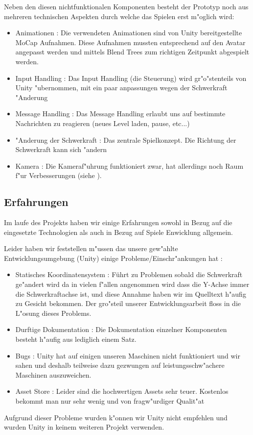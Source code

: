 Neben den diesen nichtfunktionalen Komponenten besteht der Prototyp noch aus mehreren technischen Aspekten durch welche das Spielen erst m"oglich wird:
\begin{itemize}
	\item Animationen : Die verwendeten Animationen sind von Unity bereitgestellte MoCap Aufnahmen. Diese Aufnahmen mussten entsprechend auf den Avatar angepasst werden und mittels Blend Trees zum richtigen Zeitpunkt abgespielt werden.
	\item Input Handling : Das Input Handling (die Steuerung) wird gr"o"stenteils von Unity "ubernommen, mit ein paar anpassungen wegen der Schwerkraft "Anderung
	\item Message Handling : Das Message Handling erlaubt uns auf bestimmte Nachrichten zu reagieren (neues Level laden, pause, etc...)
	\item "Anderung der Schwerkraft : Das zentrale Spielkonzept. Die Richtung der Schwerkraft kann sich "andern
	\item Kamera : Die Kameraf"uhrung funktioniert zwar, hat allerdings noch Raum f"ur Verbesserungen (siehe ).
\end{itemize} 
%
\subsection{Erfahrungen}
\label{sec:results/xp}
%
Im laufe des Projekts haben wir einige Erfahrungen sowohl in Bezug auf die eingesetzte Technologien als auch in Bezug auf Spiele Enwicklung allgemein.

Leider haben wir feststellen m"ussen das unsere gew"ahlte Entwicklungsumgebung (Unity) einige Probleme/Einschr"ankungen hat :
\begin{itemize}
	\item Statisches Koordinatensystem : Führt zu Problemen sobald die Schwerkraft ge"andert wird da in vielen f"allen angenommen wird dass die Y-Achse immer die Schwerkraftachse ist, und diese Annahme haben wir im Quelltext h"aufig zu Gesicht bekommen. Der gro"steil unserer Entwicklungsarbeit floss in die L"osung dieses Problems.
	\item Durftige Dokumentation : Die Dokumentation einzelner Komponenten besteht h"aufig aus lediglich einem Satz.
	\item Bugs : Unity hat auf einigen unseren Maschinen nicht funktioniert und wir sahen und deshalb teilweise dazu gezwungen auf leistungsschw"achere Maschinen auszuweichen.
	\item Asset Store : Leider sind die hochwertigen Assets sehr teuer. Kostenlos bekommt man nur sehr wenig und von fragw"urdiger Qualit"at
\end{itemize}
Aufgrund dieser Probleme wurden k"onnen wir Unity nicht empfehlen und wurden Unity in keinem weiteren Projekt verwenden.

